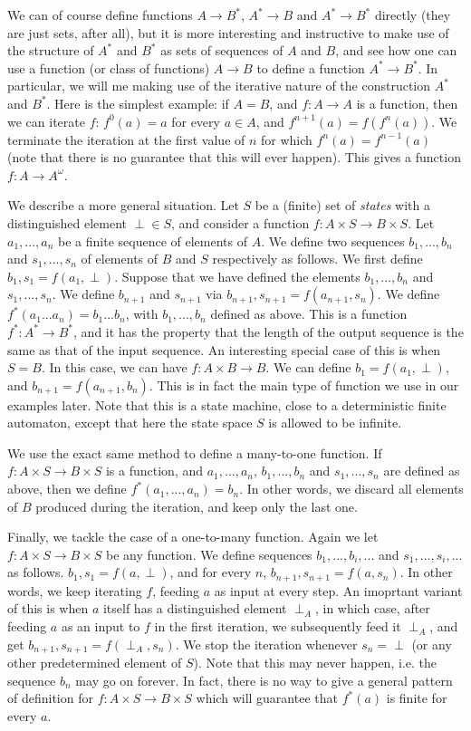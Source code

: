 \documentclass[10pt]{amsart}
\theoremstyle{definition}
\begin{document}
We can of course define functions $A\to B^*$, $A^*\to B$ and $A^*\to B^*$ directly (they are just sets, after all), but it is more interesting and instructive to make use of the structure of $A^*$ and $B^*$ as sets of sequences of $A$ and $B$, and see how one can use a function (or class of functions) $A\to B$ to define a function $A^*\to B^*$. In particular, we will me making use of the iterative nature of the construction $A^*$ and $B^*$. Here is the simplest example: if $A=B$, and $f:A\to A$ is a function, then we can iterate $f$: $f^0(a)=a$ for every $a\in A$, and $f^{n+1}(a) = f(f^n(a))$. We terminate the iteration at the first value of $n$ for which $f^n(a)=f^{n-1}(a)$ (note that there is no guarantee that this will ever happen). This gives a function $f:A\to A^\omega$.

We describe a more general situation. Let $S$ be a (finite) set of {\em states} with a distinguished element $\perp\in S$, and consider a function $f:A\times S\to B\times S$. Let $a_1,...,a_n$ be a finite sequence of elements of $A$.  We define two sequences $b_1,...,b_n$ and $s_1,...,s_n$ of elements of $B$ and $S$ respectively as follows.  We first define $b_1, s_1 = f(a_1, \perp)$.  Suppose that we have defined the elements $b_1,...,b_n$ and $s_1,...,s_n$.  We define $b_{n+1}$ and $s_{n+1}$ via $b_{n+1}, s_{n+1} = f(a_{n+1}, s_n)$.  We define $f^*(a_1...a_n)=b_1...b_n$, with $b_1,...,b_n$ defined as above.  This is a function $f^*:A^*\to B^*$, and it has the property that the length of the output sequence is the same as that of the input sequence.  An interesting special case of this is when $S=B$. In this case, we can have $f:A\times B\to B$. We can define $b_1 = f(a_1, \perp)$, and $b_{n+1}=f(a_{n+1}, b_n)$. This is in fact the main type of function we use in our examples later. Note that this is a state machine, close to a deterministic finite automaton, except that here the state space $S$ is allowed to be infinite.

We use the exact same method to define a many-to-one function. If $f:A\times S\to B\times S$ is a function, and  $a_1,...,a_n$, $b_1,...,b_n$ and $s_1,...,s_n$ are defined as above, then we define $f^*(a_1,...,a_n)=b_n$.  In other words, we discard all elements of $B$ produced during the iteration, and keep only the last one.

Finally, we tackle the case of a one-to-many function. Again we let $f:A\times S\to B\times S$ be any function. We define sequences $b_1,...,b_i,...$ and $s_1,...,s_i,...$ as follows. $b_1,s_1=f(a,\perp)$, and for every $n$, $b_{n+1}, s_{n+1}=f(a, s_n)$. In other words, we keep iterating $f$, feeding $a$ as input at every step. An imoprtant variant of this is when $a$ itself has a distinguished element $\perp_A$, in which case, after feeding $a$ as an input to $f$ in the first iteration, we subsequently feed it $\perp_A$, and get $b_{n+1}, s_{n+1}=f(\perp_A, s_n)$.  We stop the iteration whenever $s_n=\perp$ (or any other predetermined element of $S$). Note that this may never happen, i.e. the sequence $b_n$ may go on forever. In fact, there is no way to give a general pattern of definition for $f:A\times S\to B\times S$ which will guarantee that $f^*(a)$ is finite for every $a$.
\end{document}
